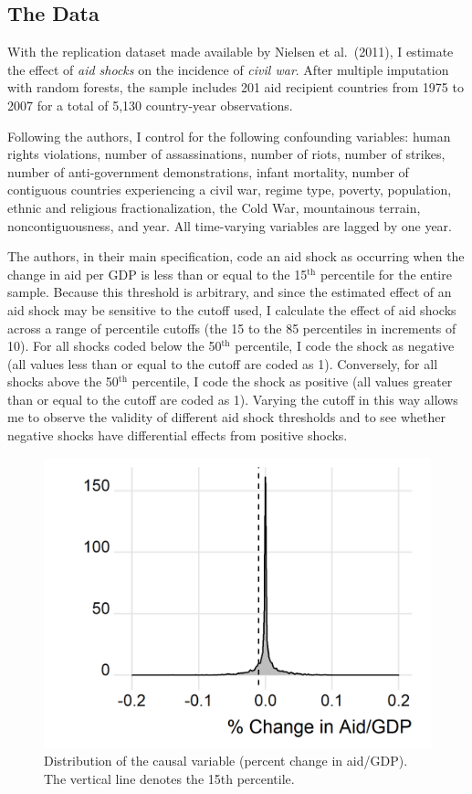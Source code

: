 \documentclass[11pt,]{article}
\begin{document}
\hypertarget{the-data}{%
\subsection{The Data}\label{the-data}}

With the replication dataset made available by Nielsen et al.~(2011), I
estimate the effect of \emph{aid shocks} on the incidence of \emph{civil
war}. After multiple imputation with random forests, the sample includes
201 aid recipient countries from 1975 to 2007 for a total of 5,130
country-year observations.

Following the authors, I control for the following confounding
variables: human rights violations, number of assassinations, number of
riots, number of strikes, number of anti-government demonstrations,
infant mortality, number of contiguous countries experiencing a civil
war, regime type, poverty, population, ethnic and religious
fractionalization, the Cold War, mountainous terrain, noncontiguousness,
and year. All time-varying variables are lagged by one year.

The authors, in their main specification, code an aid shock as occurring
when the change in aid per GDP is less than or equal to the
15\(^\text{th}\) percentile for the entire sample. Because this
threshold is arbitrary, and since the estimated effect of an aid shock
may be sensitive to the cutoff used, I calculate the effect of aid
shocks across a range of percentile cutoffs (the 15 to the 85
percentiles in increments of 10). For all shocks coded below the
50\(^\text{th}\) percentile, I code the shock as negative (all values
less than or equal to the cutoff are coded as 1). Conversely, for all
shocks above the 50\(^\text{th}\) percentile, I code the shock as
positive (all values greater than or equal to the cutoff are coded as
1). Varying the cutoff in this way allows me to observe the validity of
different aid shock thresholds and to see whether negative shocks have
differential effects from positive shocks.

\begin{figure}
\centering
\includegraphics{histplot.png}
\caption{Distribution of the causal variable (percent change in
aid/GDP). The vertical line denotes the 15th percentile.}
\end{figure}
\end{document}
